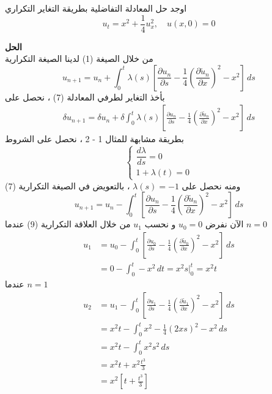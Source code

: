\begin{example}
	اوجد حل المعادلة التفاضلية بطريقة التغاير التكراري
	\[
	u_t = x^2 + \frac{1}{4} u_x^2,\quad u(x, 0) =0
	\]
\end{example}
\noindent
\textbf{الحل}\\
\noindent
من خلال الصيغة (1) لدينا الصيغة التكرارية
\begin{equation}
	u_{n+1} = u_n + \int_{0}^{t} \lambda(s) \left[\frac{\partial u_n}{\partial s} - \frac{1}{4}\left(\frac{\partial \tilde{u}_n}{\partial x}\right)^2 - x^2\right] \, ds
\end{equation}
بأخذ التغاير لطرفي المعادلة (7) ، نحصل على 
\begin{align*}
	\delta u_{n+1}= \delta u_n + \delta \int_{0}^{t} \lambda(s) \left[\frac{\partial u_n}{\partial s} - \frac{1}{4}\left(\frac{\partial \tilde{u}_n}{\partial x}\right)^2 - x^2\right] \, ds
\end{align*}
بطريقة مشابهة للمثال 1 - 2 ، نحصل على الشروط 
\begin{equation}
	\begin{cases}
		\dfrac{d \lambda}{ds} = 0 \\
		1 + \lambda(t) = 0
	\end{cases}
\end{equation}
ومنه نحصل على $\lambda(s)=-1$ ، بالتعويض في الصيغة التكرارية (7)
\begin{equation}
		u_{n+1} = u_n - \int_{0}^{t}  \left[\frac{\partial u_n}{\partial s} - \frac{1}{4}\left(\frac{\partial \tilde{u}_n}{\partial x}\right)^2 - x^2\right] \, ds
\end{equation}
الآن نفرض $u_0=0 $ و نحسب $u_1$ من خلال العلاقة التكرارية (9) عندما $n=0$
\begin{align*}
			u_{1} &= u_0 - \int_{0}^{t}  \left[\frac{\partial u_0}{\partial s} - \frac{1}{4}\left(\frac{\partial \tilde{u}_0}{\partial x}\right)^2  - x^2\right] \, ds\\
			&= 0 - \int_{0}^{t} -x^2 \, dt
			= x^2 s\Big|^t_0 = x^2t
\end{align*}
عندما $n=1$
\begin{align*}
		u_{2} &= u_1 - \int_{0}^{t}  \left[\frac{\partial u_1}{\partial s} - \frac{1}{4}\left(\frac{\partial \tilde{u}_1}{\partial x}\right)^2  - x^2\right] \, ds\\
		&= x^2 t - \int_{0}^t x^2 - \frac{1}{4}(2xs)^2 - x^2 \, ds\\
		&= x^2 t - \int_{0}^{t} x^2s^2\, ds\\
		&= x^2 t + x^2 \frac{t^3}{3}\\
		&= x^2 \left[t + \frac{t^3}{3}\right]
\end{align*}
